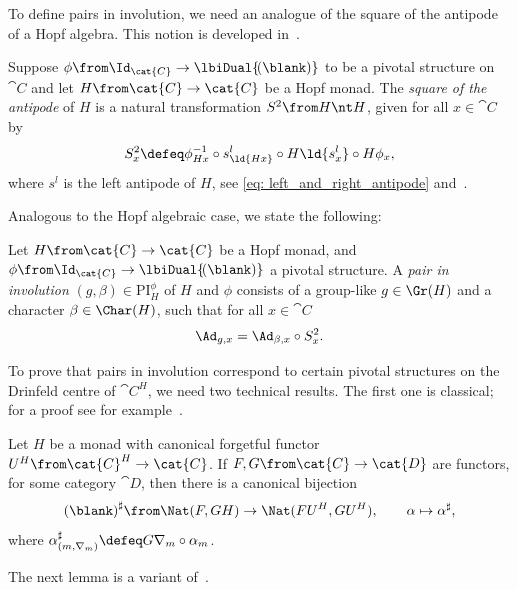 To define pairs in involution, we need an analogue of the square of the antipode of a Hopf algebra.
This notion is developed in~\cite[Section~7.3]{Bruguieres2007}.

\begin{definition} \label{def: s-squared}
  Suppose \(\phi \from \Id_{\cat{C}} \to \lbiDual{\!(\blank)}\) to be a pivotal structure on \(\cat{C}\)
  and let \(H \from \cat{C} \to \cat{C}\) be a Hopf monad.
  The \emph{square of the antipode} of \(H\) is a natural transformation \(S^{2}\from H \nt H\),
  given for all \(x \in \cat{C}\) by
  \[
    S^2_x \defeq \phi^{-1}_{Hx} \circ s^l_{\ld{Hx}} \circ H\ld{s^l_x} \circ H\phi_x,
  \]
  where \(s^l\) is the left antipode of \(H\),
  see \cref{eq: left_and_right_antipode} and~\cite[Section~3.3]{Bruguieres2007}.
\end{definition}

Analogous to the Hopf algebraic case, we state the following:

\begin{definition}\label{def: pair_in_involution_Hopf_monad}
  Let \(H \from \cat{C} \to \cat{C}\) be a Hopf monad,
  and \(\phi \from \Id_{\cat{C}} \to \lbiDual{\!(\blank)}\) a pivotal structure.
  A \emph{pair in involution}
  \((g, \beta) \in \mathrm{PI}_H^{\phi}\)
  of \(H\) and \(\phi\) consists of
  a group-like \(g \in \Gr(H)\) and
  a character \(\beta \in \Char(H)\),
  such that for all \(x \in \cat{C}\)
  \[
    \Ad_{g, x} =  \Ad_{\beta,x} \circ S^{2}_{x}.
  \]
\end{definition}

To prove that pairs in involution correspond to certain pivotal structures on the Drinfeld centre of \(\cat{C}^H\), we need two technical results.
The first one is classical; for a proof see for example~\cite[Lemmas~1.2 and~1.3]{Bruguieres2007}.

\begin{lemma}\label{lem: sharp-lift}
  Let \(H\) be a monad with canonical forgetful functor \(U^H \from  \cat{C}^H \to \cat{C}\).
  If \(F, G \from \cat{C} \to \cat{D}\) are functors, for some category \(\cat{D}\),
  then there is a canonical bijection
  \[
    {(\blank)}^{\sharp}\from \Nat(F, GH) \to \Nat(FU^H, GU^H), \qquad \alpha \mapsto \alpha^{\sharp},
  \]
  where \(\alpha^{\sharp}_{(m, \nabla_m)} \defeq G\nabla_m \circ \alpha_m\).
\end{lemma}

The next lemma is a variant of~\cite[Lemma~7.5]{Bruguieres2007}.

